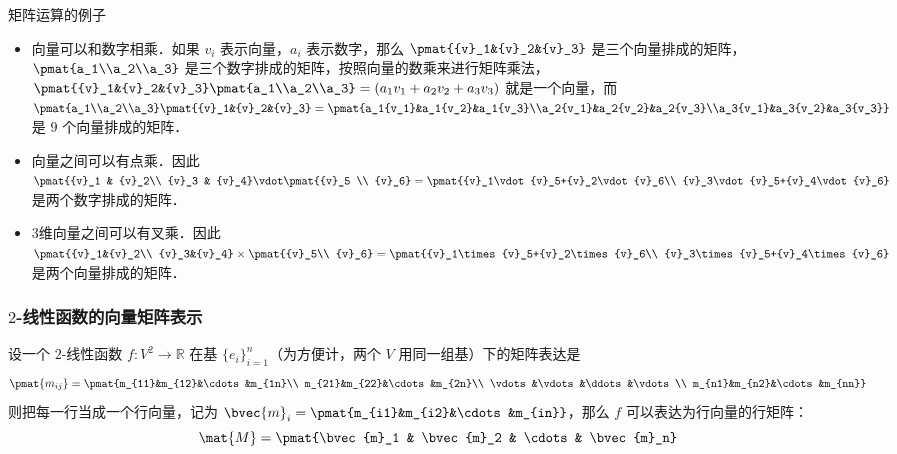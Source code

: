 \begin{example}{矩阵运算的例子}

\begin{itemize}
%
\item 向量可以和数字相乘．如果 ${v}_i$ 表示向量，$a_i$ 表示数字，那么 $\pmat{{v}_1&{v}_2&{v}_3}$ 是三个向量排成的矩阵，$\pmat{a_1\\a_2\\a_3}$ 是三个数字排成的矩阵，按照向量的数乘来进行矩阵乘法，$\pmat{{v}_1&{v}_2&{v}_3}\pmat{a_1\\a_2\\a_3}=(a_1{v}_1+a_2{v}_2+a_3{v}_3)$ 就是一个向量，而 $\pmat{a_1\\a_2\\a_3}\pmat{{v}_1&{v}_2&{v}_3}=\pmat{a_1{v_1}&a_1{v_2}&a_1{v_3}\\a_2{v_1}&a_2{v_2}&a_2{v_3}\\a_3{v_1}&a_3{v_2}&a_3{v_3}}$ 是 $9$ 个向量排成的矩阵．
\item 向量之间可以有点乘．因此 $\pmat{{v}_1 & {v}_2\\ {v}_3 & {v}_4}\vdot \pmat{{v}_5 \\ {v}_6}=\pmat{{v}_1\vdot{v}_5+{v}_2\vdot{v}_6\\ {v}_3\vdot{v}_5+{v}_4\vdot{v}_6}$ 是两个数字排成的矩阵．
\item 3维向量之间可以有叉乘．因此 $\pmat{{v}_1&{v}_2\\ {v}_3&{v}_4}\times\pmat{{v}_5\\ {v}_6}=\pmat{{v}_1\times{v}_5+{v}_2\times{v}_6\\ {v}_3\times{v}_5+{v}_4\times{v}_6}$ 是两个向量排成的矩阵．
\end{itemize}
\end{example}


\subsubsection{$2$-线性函数的向量矩阵表示}

设一个 $2$-线性函数 $f:V^2\rightarrow\mathbb{R}$ 在基 $\{{e}_i\}_{i=1}^n$（为方便计，两个 $V$ 用同一组基）下的矩阵表达是
\begin{equation}
\pmat{m_{ij}}=\pmat{m_{11}&m_{12}&\cdots&m_{1n}\\ m_{21}&m_{22}&\cdots&m_{2n}\\ \vdots&\vdots&\ddots&\vdots\\ m_{n1}&m_{n2}&\cdots&m_{nn}}
\end{equation}
则把每一行当成一个行向量，记为 $\bvec {m}_i = \pmat{m_{i1}&m_{i2}&\cdots&m_{in}}$，那么 $f$ 可以表达为行向量的行矩阵：
\begin{equation}\label{Tensor_eq3}
\mat{M}=\pmat{\bvec{m}_1 & \bvec{m}_2 & \cdots & \bvec{m}_n}
\end{equation}

